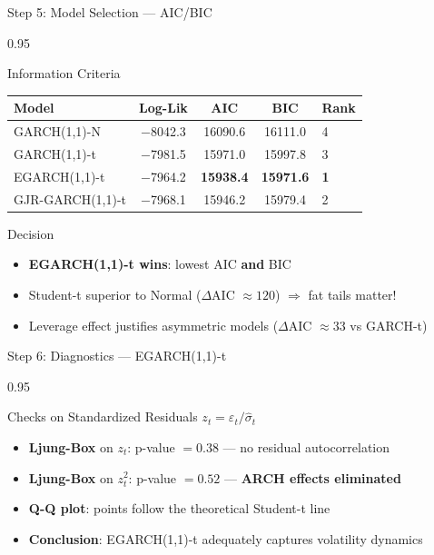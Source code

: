 \documentclass[9pt, aspectratio=169, t]{beamer}
\begin{document}
\begin{frame}{Step 5: Model Selection --- AIC/BIC}
    \begin{cminipage}{0.95\textwidth}
    \begin{block}{Information Criteria}
        \begin{center}
        {\small
        \begin{tabular}{lcccl}
            \toprule
            \textbf{Model} & \textbf{Log-Lik} & \textbf{AIC} & \textbf{BIC} & \textbf{Rank} \\
            \midrule
            GARCH(1,1)-N & $-$8042.3 & 16090.6 & 16111.0 & 4 \\
            GARCH(1,1)-t & $-$7981.5 & 15971.0 & 15997.8 & 3 \\
            EGARCH(1,1)-t & $-$7964.2 & \textbf{15938.4} & \textbf{15971.6} & \textbf{1} \\
            GJR-GARCH(1,1)-t & $-$7968.1 & 15946.2 & 15979.4 & 2 \\
            \bottomrule
        \end{tabular}
        }
        \end{center}
    \end{block}
    \begin{exampleblock}{Decision}
        \begin{itemize}\setlength{\itemsep}{0pt}
            \item \textbf{EGARCH(1,1)-t wins}: lowest AIC \textbf{and} BIC
            \item Student-t superior to Normal ($\Delta$AIC $\approx 120$) $\Rightarrow$ fat tails matter!
            \item Leverage effect justifies asymmetric models ($\Delta$AIC $\approx 33$ vs GARCH-t)
        \end{itemize}
    \end{exampleblock}
    \end{cminipage}
\end{frame}

\begin{frame}{Step 6: Diagnostics --- EGARCH(1,1)-t}
    \begin{cminipage}{0.95\textwidth}
    {\small
    \begin{block}{Checks on Standardized Residuals $z_t = \varepsilon_t / \hat{\sigma}_t$}
            \begin{itemize}\setlength{\itemsep}{0pt}
                \item \textbf{Ljung-Box} on $z_t$: p-value $= 0.38$ --- no residual autocorrelation
                \item \textbf{Ljung-Box} on $z_t^2$: p-value $= 0.52$ --- \textbf{ARCH effects eliminated}
                \item \textbf{Q-Q plot}: points follow the theoretical Student-t line
                \item \textbf{Conclusion}: EGARCH(1,1)-t adequately captures volatility dynamics
            \end{itemize}
        \end{block}
    }
    \end{cminipage}
\end{frame}
\end{document}
